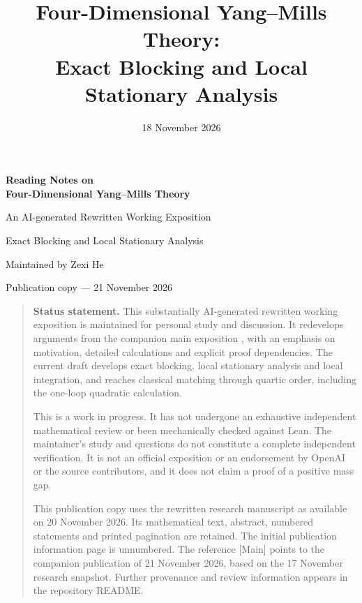 \documentclass[11pt,reqno]{amsart}
\title[Yang--Mills: local stationary analysis]
{Four-Dimensional Yang--Mills Theory:\\
Exact Blocking and Local Stationary Analysis}
\author{}
\date{18 November 2026}
\numberwithin{equation}{section}
\theoremstyle{definition}
\theoremstyle{remark}
\begin{document}
\hypersetup{pageanchor=false}
\begingroup
\thispagestyle{empty}
\begin{center}
\vspace*{20mm}
{\LARGE\bfseries Reading Notes on\\[4pt]Four-Dimensional Yang--Mills Theory\par}
\vspace{8mm}
{\Large An AI-generated Rewritten Working Exposition\par}
\vspace{3mm}
{\large Exact Blocking and Local Stationary Analysis\par}
\vspace{10mm}
Maintained by Zexi He\par
\medskip
Publication copy --- 21 November 2026\par
\end{center}
\vspace{7mm}
\begin{quote}
\small
\textbf{Status statement.}
This substantially AI-generated rewritten working exposition is maintained
for personal study and discussion. It redevelops arguments from the
companion main exposition \cite{Main}, with an emphasis on motivation,
detailed calculations and explicit proof dependencies. The current
draft develops exact blocking, local stationary analysis and local
integration, and reaches classical matching through quartic order,
including the one-loop quadratic calculation.

This is a work in progress. It has not undergone an exhaustive
independent mathematical review or been mechanically checked against
Lean. The maintainer's study and questions do not constitute a complete
independent verification. It is not an official exposition or an
endorsement by OpenAI or the source contributors, and it does not claim
a proof of a positive mass gap.

This publication copy uses the rewritten research manuscript as
available on 20 November 2026. Its mathematical text, abstract,
numbered statements and printed pagination are retained. The initial
publication information page is unnumbered. The reference [Main] points
to the companion publication of 21 November 2026, based on the
17 November research snapshot. Further provenance and review information
appears in the repository README.
\end{quote}
\endgroup
\clearpage
{}
\hypersetup{pageanchor=true}
\end{document}

